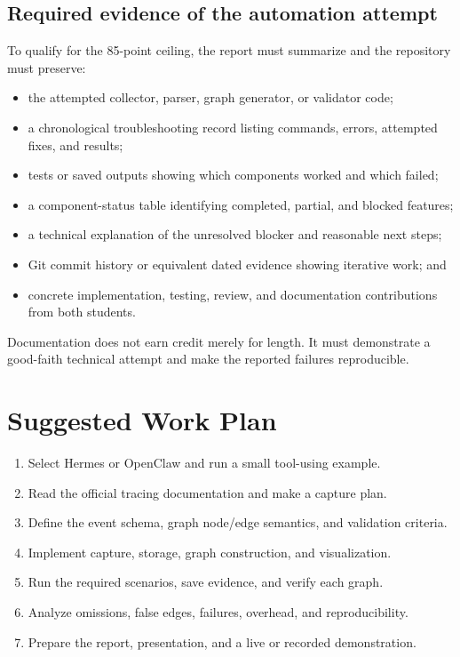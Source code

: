 \documentclass[11pt]{article}
\begin{document}
\subsection{Required evidence of the automation attempt}
To qualify for the 85-point ceiling, the report must summarize and the repository must preserve:
\begin{itemize}
  \item the attempted collector, parser, graph generator, or validator code;
  \item a chronological troubleshooting record listing commands, errors, attempted fixes, and results;
  \item tests or saved outputs showing which components worked and which failed;
  \item a component-status table identifying completed, partial, and blocked features;
  \item a technical explanation of the unresolved blocker and reasonable next steps;
  \item Git commit history or equivalent dated evidence showing iterative work; and
  \item concrete implementation, testing, review, and documentation contributions from both students.
\end{itemize}
Documentation does not earn credit merely for length. It must demonstrate a good-faith technical attempt and make the reported failures reproducible.

\section{Suggested Work Plan}
\begin{enumerate}
  \item Select Hermes or OpenClaw and run a small tool-using example.
  \item Read the official tracing documentation and make a capture plan.
  \item Define the event schema, graph node/edge semantics, and validation criteria.
  \item Implement capture, storage, graph construction, and visualization.
  \item Run the required scenarios, save evidence, and verify each graph.
  \item Analyze omissions, false edges, failures, overhead, and reproducibility.
  \item Prepare the report, presentation, and a live or recorded demonstration.
\end{enumerate}
\end{document}
